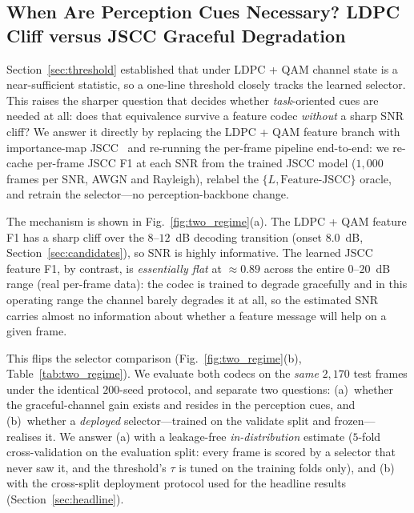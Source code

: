 \documentclass[journal]{IEEEtran}
\begin{document}
\subsection{When Are Perception Cues Necessary? LDPC Cliff versus JSCC Graceful Degradation}\label{sec:jscc_aware}

Section~\ref{sec:threshold} established that under LDPC + QAM channel state is a
near-sufficient statistic, so a one-line threshold closely tracks the learned selector. This
raises the sharper question that decides whether \emph{task}-oriented cues are needed at
all: does that equivalence survive a feature codec \emph{without} a sharp SNR cliff? We
answer it directly by replacing the LDPC + QAM feature branch with importance-map
JSCC~\cite{sheng2024importance} and re-running the per-frame pipeline end-to-end: we
re-cache per-frame JSCC F1 at each SNR from the trained JSCC model ($1{,}000$ frames per
SNR, AWGN and Rayleigh), relabel the $\{L,\text{Feature-JSCC}\}$ oracle, and retrain the
selector---no perception-backbone change.

The mechanism is shown in Fig.~\ref{fig:two_regime}(a). The LDPC + QAM feature F1 has a
sharp cliff over the $8$--$12$~dB decoding transition (onset $8.0$~dB, Section~\ref{sec:candidates}), so SNR is highly informative. The learned
JSCC feature F1, by contrast, is \emph{essentially flat} at $\approx 0.89$ across the
entire $0$--$20$~dB range (real per-frame data): the codec is trained to degrade
gracefully and in this operating range the channel barely degrades it at all, so the
estimated SNR carries almost no information about whether a feature message will help on
a given frame.

This flips the selector comparison (Fig.~\ref{fig:two_regime}(b), Table~\ref{tab:two_regime}).
We evaluate both codecs on the \emph{same} $2{,}170$ test frames under the identical
$200$-seed protocol, and separate two questions: (a)~whether the graceful-channel gain exists
and resides in the perception cues, and (b)~whether a \emph{deployed} selector---trained on
the validate split and frozen---realises it. We answer (a) with a leakage-free
\emph{in-distribution} estimate ($5$-fold cross-validation on the evaluation split: every frame
is scored by a selector that never saw it, and the threshold's $\tau$ is tuned on the training
folds only), and (b) with the cross-split deployment protocol used for the headline results
(Section~\ref{sec:headline}).
\end{document}
